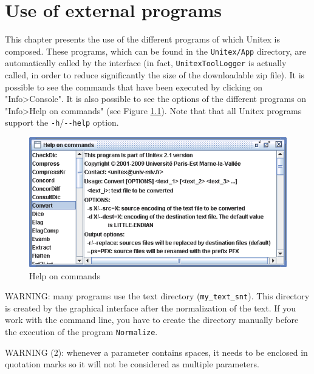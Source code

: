 


\chapter{Use of external programs}
\label{chap-external-programs}
This chapter presents the use of the different programs of which Unitex is
composed. These programs, which can be found in the \verb+Unitex/App+ directory, are
automatically called by the interface (in fact, \verb+UnitexToolLogger+ is
actually called, in order to reduce significantly the size of the downloadable
zip file). It is possible to see the commands that have been executed by
clicking on "Info>Console". It is also possible to see the options of the different programs on "Info>Help on commands" (see Figure \ref{fig-help}). Note that that all Unitex
programs support the \verb$-h$/\verb$--help$ option.

\bigskip
\begin{figure}[!h]
\begin{center}
\includegraphics[width=14cm]{resources/img/fig11-1.png}
\caption{Help on commands\label{fig-help}}
\end{center}
\end{figure}

\bigskip
\noindent WARNING: many programs use the text directory
(\verb+my_text_snt+). This directory is created by the graphical interface after
the normalization of the text. If you work with the command line, you have to
create the directory manually before the execution of the program
\verb+Normalize+.

\bigskip
\noindent WARNING (2): whenever a parameter contains spaces, it needs to
be enclosed in quotation marks so it will not be considered as multiple
parameters.

